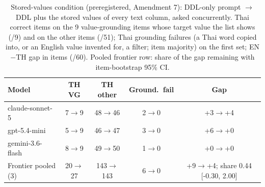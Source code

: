 \begin{table}[t]
\caption{Stored-values condition (preregistered, Amendment 7): DDL-only
prompt $\to$ DDL plus the stored values of every text column, asked
concurrently. Thai correct items on the 9 value-grounding items whose
target value the list shows (/9) and on the other items (/51); Thai grounding failures (a Thai word copied into, or an English value
invented for, a filter; item majority) on the first set; EN$-$TH gap in
items (/60). Pooled frontier row: share of the gap remaining with
item-bootstrap 95\% CI.}
\label{tab:valuehints}
\centering\footnotesize\setlength{\tabcolsep}{3pt}
\begin{tabular}{lcccc}
\toprule
Model & TH VG & TH other & Ground.\ fail & Gap \\
\midrule
claude-sonnet-5 & 7$\to$9 & 48$\to$46 & 2$\to$0 & +3$\to$+4 \\
gpt-5.4-mini & 5$\to$9 & 46$\to$47 & 3$\to$0 & +6$\to$+0 \\
gemini-3.6-flash & 8$\to$9 & 49$\to$50 & 1$\to$0 & +0$\to$+0 \\
\midrule
Frontier pooled (3) & 20$\to$27 & 143$\to$143 & 6$\to$0 & +9$\to$+4; share 0.44 [-0.30, 2.00] \\
\bottomrule
\end{tabular}
\end{table}

